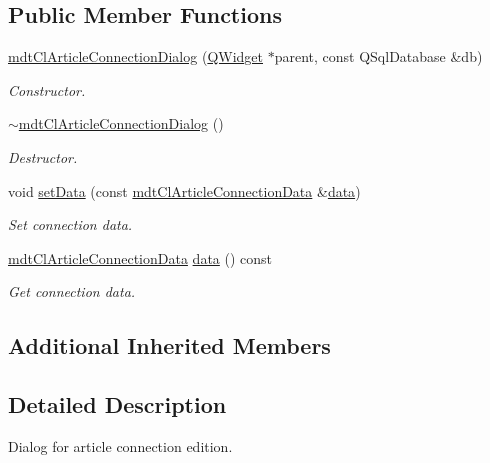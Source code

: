\subsection*{Public Member Functions}
\begin{DoxyCompactItemize}
\item 
\hyperlink{classmdt_cl_article_connection_dialog_abc1ee29dfcae7f653a4969636014a354}{mdt\-Cl\-Article\-Connection\-Dialog} (\hyperlink{class_q_widget}{Q\-Widget} $\ast$parent, const Q\-Sql\-Database \&db)
\begin{DoxyCompactList}\small\item\em Constructor. \end{DoxyCompactList}\item 
\hyperlink{classmdt_cl_article_connection_dialog_acc899bf48e5f7637d9a04e57553fd718}{$\sim$mdt\-Cl\-Article\-Connection\-Dialog} ()
\begin{DoxyCompactList}\small\item\em Destructor. \end{DoxyCompactList}\item 
void \hyperlink{classmdt_cl_article_connection_dialog_a2cccdff30a974a2bfb71c8603484f00b}{set\-Data} (const \hyperlink{classmdt_cl_article_connection_data}{mdt\-Cl\-Article\-Connection\-Data} \&\hyperlink{classmdt_cl_article_connection_dialog_a116043b66b6d34281ee7200834a97903}{data})
\begin{DoxyCompactList}\small\item\em Set connection data. \end{DoxyCompactList}\item 
\hyperlink{classmdt_cl_article_connection_data}{mdt\-Cl\-Article\-Connection\-Data} \hyperlink{classmdt_cl_article_connection_dialog_a116043b66b6d34281ee7200834a97903}{data} () const 
\begin{DoxyCompactList}\small\item\em Get connection data. \end{DoxyCompactList}\end{DoxyCompactItemize}
\subsection*{Additional Inherited Members}


\subsection{Detailed Description}
Dialog for article connection edition. 

